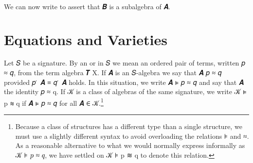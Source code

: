 \documentclass[a4paper,UKenglish,cleveref,autoref,thm-restate]{lipics-v2021}
\begin{document}
\ccpad
\begin{code}%
\>[0]\AgdaSpace{}%
\AgdaSymbol{:}\AgdaSpace{}%
\AgdaSymbol{\{}\AgdaSpace{}%
\AgdaSpace{}%
\AgdaSymbol{:}\AgdaSpace{}%
\AgdaSymbol{\}(}\AgdaSpace{}%
\AgdaSymbol{:}\AgdaSpace{}%
\AgdaSpace{}%
\AgdaSpace{}%
\AgdaSymbol{)(}\AgdaSpace{}%
\AgdaSymbol{:}\AgdaSpace{}%
\AgdaSpace{}%
\AgdaSpace{}%
\AgdaSymbol{)}\AgdaSpace{}%
\AgdaSpace{}%
\AgdaSpace{}%
\AgdaSpace{}%
\AgdaSpace{}%
\AgdaSpace{}%
\AgdaSpace{}%
\AgdaSpace{}%
\AgdaSpace{}%
\<%
\\
\>[0]\AgdaSpace{}%
\AgdaSpace{}%
\AgdaSpace{}%
\AgdaSymbol{=}\AgdaSpace{}%
\AgdaSpace{}%
\AgdaSpace{}%
\<%
\end{code}
\ccpad
We can now write    to assert that 𝑩 is a subalgebra of 𝑨.






\section{Equations and Varieties}\label{sec:equations-and-varieties}

Let \ab 𝑆 be a signature. By an  or  in \ab 𝑆 we mean an ordered pair of terms, written \ab 𝑝 \aof ≈ \ab 𝑞, from the term algebra \af 𝑻 \ab X. If \ab 𝑨 is an \ab 𝑆-algebra we say that \ab 𝑨  \ab 𝑝 \aof ≈ \ab 𝑞 provided \ab 𝑝 \af ̇ \ab 𝑨 \aod ≡ \ab 𝑞 \aof ̇ \ab 𝑨 holds. In this situation, we write \ab 𝑨 \aof ⊧ \ab 𝑝 \aof ≈ \ab 𝑞 and say that \ab 𝑨  the identity \ab 𝑝 \aof ≈ \ab q. If \ab 𝒦 is a class of algebras of the same signature, we write \ab 𝒦 \aof ⊧ \ab p \aof ≋ \ab q if \ab 𝑨 \aof ⊧ \ab 𝑝 \aof ≈ \ab 𝑞 for all \ab 𝑨 \aof ∈ \ab 𝒦.\footnote{Because a class of structures has a different type than a single structure, we must use a slightly different syntax to avoid overloading the relations \af ⊧ and \af ≈. As a reasonable alternative to what we would normally express informally as 𝒦 \aof ⊧ \ab 𝑝 \aof ≈ \ab 𝑞, we have settled on \ab 𝒦 \aof ⊧ \ab p \aof ≋ \ab q to denote this relation.}
\end{document}
